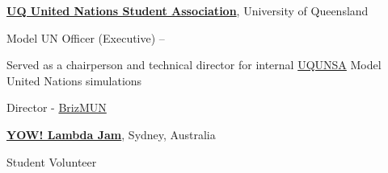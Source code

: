 \documentclass[a4paper,10pt,oneside]{article}
\begin{document}
\begin{body}
\EntryGap

\href{http://www.unsauq.org/}
{\textbf{UQ United Nations Student Association}}, University of Queensland

\par Model UN Officer (Executive)\hfill {} -- 

\begin{detail}
\BulletItem Served as a chairperson and technical director for internal \href{http://www.unsauq.org/}{UQUNSA} Model United Nations simulations 
\end{detail}

\par Director - \href{http://www.brizmun.com/}{BrizMUN} \hfill {}

\EntryGap

\href{http://lambdajam.yowconference.com.au/}
{\textbf{YOW! Lambda Jam}}, Sydney, Australia  

\par Student Volunteer\hfill {} 

\begin{detail}
\end{detail}





\end{body}
\end{document}

